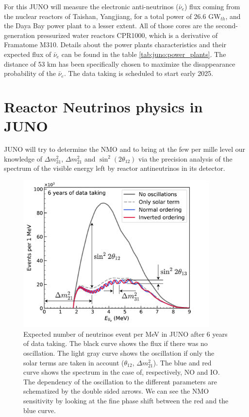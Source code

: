 \documentclass[../main.tex]{subfiles}
\begin{document}
For this JUNO will measure the electronic anti-neutrinos ($\bar{\nu}_e$) flux coming from the nuclear reactors of Taishan, Yangjiang, for a total power of 26.6 GW$_{th}$, and the Daya Bay power plant to a lesser extent. All of those cores are the second-generation pressurized water reactors CPR1000, which is a derivative of Framatome M310. Details about the power plants characteristics and their expected flux of $\bar{\nu}_e$ can be found in the table \ref{tab:juno:power_plants}.
The distance of 53 km has been specifically chosen to maximize the disappearance probability of the $\bar{\nu}_e$. The data taking is scheduled to start early 2025.

\section{Reactor Neutrinos physics in JUNO}

JUNO will try to determine the NMO and to bring at the few per mille level our knowledge of $\Delta m^2_{31}$,  $\Delta m^2_{21}$ and $\sin^2(2\theta_{12})$  via the precision analysis of the spectrum of the visible energy left by reactor antineutrinos in its detector.

\begin{figure}
  \centering
  \includegraphics[height=8cm]{images/juno/Spectrum-OscillationsOnly_dm2_31.png}
  \caption{Expected number of neutrinos event per MeV in JUNO after 6 years of data taking. The black curve shows the flux if there was no oscillation. The light gray curve shows the oscillation if only the solar terms are taken in account ($\theta_{12}$, $\Delta m_{21}^2$). The blue and red curve shows the spectrum in the case of, respectively, NO and IO. The dependency of the oscillation to the different parameters are schematized by the double sided arrows. We can see the NMO sensitivity by looking at the fine phase shift between the red and the blue curve.}
  \label{fig:juno:juno-spectrum-oscillation}
\end{figure}
\end{document}
